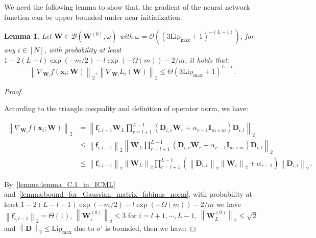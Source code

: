 \documentclass[nohyperref]{article}
\theoremstyle{plain}
\newtheorem{lemma}{Lemma}
\theoremstyle{definition}
\theoremstyle{remark}
\begin{document}
We need the following lemma to show that, the gradient of the neural network function can be upper bounded under near initialization.
\begin{lemma}
\label{lemma:lemma_B.3_in_GuQuanquan}
Let $\bm{W} \in \mathcal{B} (\bm{W}^{(0)},\omega )$   with $\omega = \mathcal{O}((3\mathrm{Lip}_{\max}+1)^{-(L-1)})$, for any $i \in [N]$, with probability at least $1-2(L-l)\exp(-m/2)-l\exp(-\Omega (m))-2/m$, it holds that:
\begin{equation*}
\left \| \nabla_{\bm{W}_l} f(\bm {x}_i;\bm{W}) \right \| _2, \left \| \nabla_{\bm{W}_l} L_i(\bm{W}) \right \| _2 \leq  \Theta(3\mathrm{Lip}_{\max}+1)^{L-l}\,.
\end{equation*}

\end{lemma}


\begin{proof}
\label{proof:lemma_B.3_in_GuQuanquan}

According to the triangle inequality and definition of operator norm, we have:

\begin{equation*}
\begin{split}
    \left \| \nabla_{\bm{W}_l} f(\bm {x} _i;\bm W  ) \right \| _2 & = \left \| \bm{f}_{i,l-1}\bm{W}_L\prod_{r=l+1}^{L-1}(\bm{D}_{i,r}\bm{W}_r+\alpha_{r-1}\bm{I}_{m\times m})\bm{D}_{i,l} \right \| _2\\
    & \leq \left \| \bm{f}_{i,l-1}\right \| _2 \left \|\bm{W}_L\prod_{r=l+1}^{L-1}(\bm{D}_{i,r}\bm{W}_r+\alpha_{r-1}\bm{I}_{m\times m})\bm{D}_{i,l} \right \| _2\\
    & \leq \left \| \bm{f}_{i,l-1}\right \| _2 \left \| \bm{W}_{L} \right \|_2  \prod_{r=l+1}^{L-1}(\left \|  \bm{D}_{i,r}\right \|_2\left \|\bm{W}_r\right \|_2 +\alpha_{r-1})\left \|  \bm{D}_{i,l}\right \|_2\,.
\end{split}
\end{equation*}

By~\cref{lemma:lemma_C.1_in_ICML} and~\cref{lemma:bound_for_Gaussian_matrix_fabinus_norm}, with probability at least $1-2(L-l-1)\exp(-m/2)-l\exp(-\Omega (m))-2/m$ we have $\left \| \bm{f}_{i,l-1}\right \| _2 = \Theta(1)$, $\left \| \bm{W}_i^{(0)}\right \| _2 \leq 3$ for $i = l+1,\cdots,L-1$, $\left \| \bm{W}_L^{(0)}\right \| _2 \leq \sqrt{2}$ and $\left \|\bm{D}\right \|_2 \leq \mathrm{Lip}_{\max}$ due to $\sigma'$ is bounded, then we have:



\end{proof}
\end{document}
